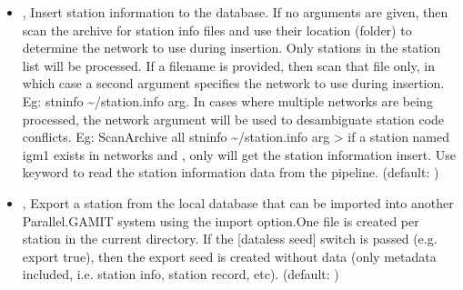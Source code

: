 \documentclass[letterpaper,10pt,english]{sphinxmanual}
\begin{document}
\begin{itemize}
\item {} 
\sphinxAtStartPar
{\hyperref[\detokenize{pgamit.com:ScanArchive.py--stninfo}]{}} , {\hyperref[\detokenize{pgamit.com:ScanArchive.py---station_info}]{}}  \sphinxhyphen{} Insert station information to the database. If no arguments are given, then scan the archive for station info files and use their location (folder) to determine the network to use during insertion. Only stations in the station list will be processed. If a filename is provided, then scan that file only, in which case a second argument specifies the network to use during insertion. Eg: \sphinxhyphen{}stninfo \textasciitilde{}/station.info arg. In cases where multiple networks are being processed, the network argument will be used to desambiguate station code conflicts. Eg: ScanArchive all \sphinxhyphen{}stninfo \textasciitilde{}/station.info arg \sphinxhyphen{}\textgreater{} if a station named igm1 exists in networks  and , only  will get the station information insert. Use keyword  to read the station information data from the pipeline. (default: )

\item {} 
\sphinxAtStartPar
{\hyperref[\detokenize{pgamit.com:ScanArchive.py--export}]{}} , {\hyperref[\detokenize{pgamit.com:ScanArchive.py---export_station}]{}}  \sphinxhyphen{} Export a station from the local database that can be imported into another Parallel.GAMIT system using the \sphinxhyphen{}import option.One file is created per station in the current directory. If the {[}dataless seed{]} switch is passed (e.g. \sphinxhyphen{}export true), then the export seed is created without data (only metadata included, i.e. station info, station record, etc). (default: )


\end{itemize}
\end{document}
